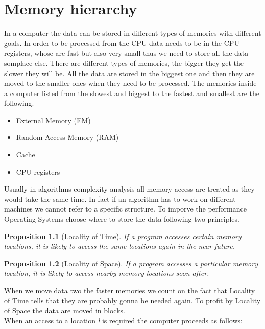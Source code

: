 \documentclass{report}
\newtheorem{prop}{Proposition}[chapter]
\begin{document}
\chapter{Memory hierarchy}
In a computer the data can be stored in different types of memories with different goals. In order to be processed from the CPU data needs to be in the CPU registers, whose are fast but also very small thus we need to store all the data somplace else. There are different types of memories, the bigger they get the slower they will be. All the data are stored in the biggest one and then they are moved to the smaller ones when they need to be processed.
The memories inside a computer listed from the slowest and biggest to the fastest and smallest are the following.
\begin{itemize}
    \item External Memory (EM)
    \item Random Access Memory (RAM)
    \item Cache
    \item CPU registers
\end{itemize}
Usually in algorithms complexity analysis all memory access are treated as they would take the same time. In fact if an algorithm has to work on different machines we cannot refer to a specific structure.
To imporve the performance Operating Systems choose where to store the data following two principles.
\begin{prop}[Locality of Time]
    If a program accesses certain memory locations, it is likely to access the same locations again in the near future.
\end{prop}
\begin{prop}[Locality of Space]
    If a program accesses a particular memory location, it is likely to access nearby memory locations soon after.
\end{prop}
\noindent
When we move data two the faster memories we count on the fact that Locality of Time tells that they are probably gonna be needed again. To profit by Locality of Space the data are moved in blocks. \\
When an access to a location \textit{l} is required the computer proceeds as follows:
\begin{algorithm}[H]
    \begin{algorithmic}[1]
    \Else{}
    \EndIf{}
    \end{algorithmic}
\end{algorithm}
\end{document}

